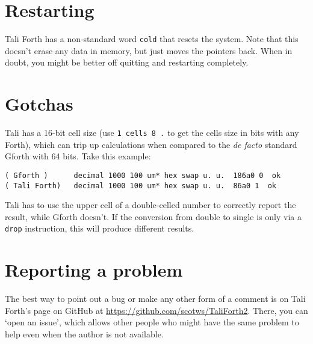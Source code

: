 \section{Restarting}

Tali Forth has a non-standard word \texttt{cold} that
resets the system. Note that this doesn't erase any data in memory, but just
moves the pointers back. When in doubt, you might be better off quitting and
restarting completely.


\section{Gotchas}

Tali has a 16-bit cell size (use \texttt{1 cells 8 \* .} to get the cells size in
bits with any Forth), which can trip up calculations when compared to the
\textit{de facto} standard Gforth with 64 bits. Take this example:

\begin{lstlisting}[frame=lines]
( Gforth )      decimal 1000 100 um* hex swap u. u.  186a0 0  ok
( Tali Forth)   decimal 1000 100 um* hex swap u. u.  86a0 1  ok
\end{lstlisting}

\noindent Tali has to use the upper cell of a double-celled
number to correctly report the result, while Gforth doesn't. If the conversion
from double to single is only via a \texttt{drop} instruction, this will produce
different results.



\section{Reporting a problem}

The best way to point out a bug or make any other form of a comment is on Tali
Forth's page on GitHub at
\href{https://github.com/scotws/TaliForth2}{https://github.com/scotws/TaliForth2}.
There, you can `open an issue', which allows other people who might have the
same problem to help even when the author is not available.



